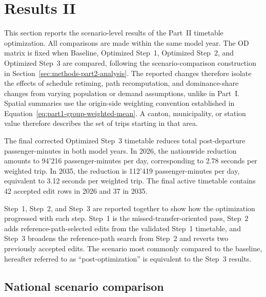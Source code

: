 \documentclass[preprint,12pt]{elsarticle}
\begin{document}
\section{Results II}\label{sec:results-part2}
This section reports the scenario-level results of the Part~II timetable optimization. All comparisons are made within the same model year. The OD matrix is fixed when Baseline, Optimized Step~1, Optimized Step~2, and Optimized Step~3 are compared, following the scenario-comparison construction in Section~\ref{sec:methods-part2-analysis}. The reported changes therefore isolate the effects of schedule retiming, path recomputation, and dominance-share changes from varying population or demand assumptions, unlike in Part~I. Spatial summaries use the origin-side weighting convention established in Equation~\eqref{eq:part1-group-weighted-mean}. A canton, municipality, or station value therefore describes the set of trips starting in that area.

The final corrected Optimized Step~3 timetable reduces total post-departure passenger-minutes in both model years. In 2026, the nationwide reduction amounts to 94'216 passenger-minutes per day, corresponding to 2.78 seconds per weighted trip. In 2035, the reduction is 112'419 passenger-minutes per day, equivalent to 3.12 seconds per weighted trip. The final active timetable contains 42 accepted edit rows in 2026 and 37 in 2035.

Step~1, Step~2, and Step~3 are reported together to show how the optimization progressed with each step. Step~1 is the missed-transfer-oriented pass, Step~2 adds reference-path-selected edits from the validated Step~1 timetable, and Step~3 broadens the reference-path search from Step~2 and reverts two previously accepted edits. The scenario most commonly compared to the baseline, hereafter referred to as ``post-optimization'' is equivalent to the Step~3 results.

\subsection{National scenario comparison}\label{sec:results-part2-national}
\end{document}

